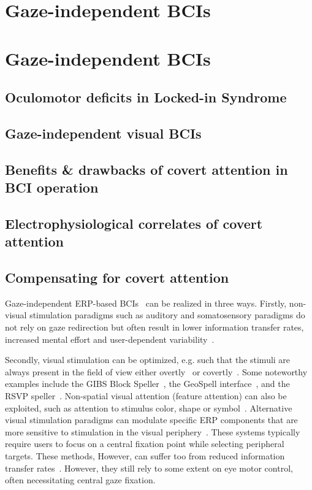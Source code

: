 \chapter{Gaze-independent BCIs}
\chapter{Gaze-independent BCIs}
\section{Oculomotor deficits in Locked-in Syndrome}
\section{Gaze-independent visual BCIs}
\section{Benefits \& drawbacks of covert attention in BCI operation}
\section{Electrophysiological correlates of covert attention}
\section{Compensating for covert attention}

Gaze-independent ERP-based BCIs~\cite{Riccio2012} can be realized in three
ways. Firstly, non-visual stimulation paradigms such as auditory and somatosensory paradigms
do not rely on gaze redirection but often result in lower information transfer
rates, increased mental effort and user-dependent variability~\cite{Reichert2020b}.

Secondly, visual stimulation can be optimized, e.g. such that the stimuli are always
present in the field of view either overtly~\cite{Acqualagna2013, Won2018,
Lin2018} or covertly~\cite{Treder2010,Pires2011,Lees2018}. Some noteworthy examples include the GIBS Block Speller~\parencite{Pires2011},
the GeoSpell interface~\parencite{Aloise2012}, and the RSVP
speller~\parencite{Acqualagna2011}.
Non-spatial visual attention (feature attention) can also be exploited, such as
attention to stimulus color, shape or symbol~\cite{Zhang2010,Treder2011,Hwang2015}.
Alternative visual stimulation paradigms can modulate specific ERP components
that are more sensitive to stimulation in the visual periphery~\cite{Schaeff2012,Xu2022}.
These systems typically require users to focus on a central fixation point while
selecting peripheral targets.
These methods, However, can suffer too from reduced information
transfer rates~\cite{Chennu2013}.
However, they still rely to some extent on
eye motor control, often necessitating central gaze fixation.

